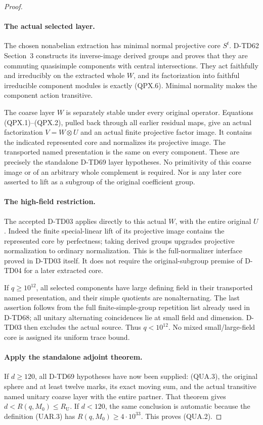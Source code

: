 \begin{proof}
\paragraph{The actual selected layer.}
The chosen nonabelian extraction has minimal normal projective core
\(S^t\). D-TD62 Section~3 constructs its inverse-image derived
groups and proves that they are commuting quasisimple components
with central intersections. They act faithfully and irreducibly on
the extracted whole \(W\), and its factorization into faithful
irreducible component modules is exactly (QPX.6).
Minimal normality makes the component action transitive.

The coarse layer \(W\) is separately stable under every original
operator. Equations (QPX.1)--(QPX.2), pulled back through all earlier
residual maps, give an actual factorization
\(V=W\otimes U\) and an actual finite projective factor image.
It contains the indicated represented core and normalizes its
projective image. The transported named presentation is the same
on every component. These are precisely the standalone D-TD69
layer hypotheses. No primitivity of this coarse image or of an
arbitrary whole complement is required. Nor is any later core
asserted to lift as a subgroup of the original coefficient group.

\paragraph{The high-field restriction.}
The accepted D-TD03 applies directly to this actual \(W\), with
the entire original \(U\). Indeed the finite special-linear lift
of its projective image contains the represented core by perfectness;
taking derived groups upgrades projective normalization to ordinary
normalization. This is the full-normalizer interface proved in
D-TD03 itself. It does not require the original-subgroup premise
of D-TD04 for a later extracted core.

If \(q\ge10^{12}\), all selected components have large defining
field in their transported named presentation, and their simple
quotients are nonalternating. The last assertion follows from the
full finite-simple-group repetition list already used in D-TD68;
all unitary alternating coincidences lie at small field and dimension.
D-TD03 then excludes the actual source. Thus \(q<10^{12}\).
No mixed small/large-field core is assigned its uniform trace bound.

\paragraph{Apply the standalone adjoint theorem.}
If \(d\ge120\), all D-TD69 hypotheses have now been supplied:
(QUA.3), the original sphere and at least twelve marks, its exact
moving sum, and the actual transitive named unitary coarse layer
with the entire partner. That theorem gives
\(d<R(q,M_0)\le R_{\mathrm U}\).
If \(d<120\), the same conclusion is automatic because the
definition (UAR.3) has \(R(q,M_0)\ge4\cdot10^{33}\).
This proves (QUA.2).
\end{proof}

